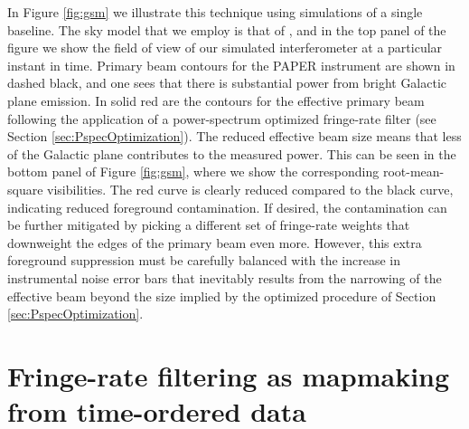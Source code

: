 \documentclass[twocolumn,apj,numberedappendix]{emulateapj}
\begin{document}
In Figure \ref{fig:gsm} we illustrate this technique using simulations of a single baseline. The sky model
that we employ is that of \citet{deoliveiracosta_et_al2008}, and in the top panel of the figure we show
the field of view of our simulated interferometer at a particular instant in time. Primary beam contours
for the PAPER instrument are shown in dashed black, and one sees that there is substantial power from
bright Galactic plane emission. In solid red are the contours for the effective primary beam following
the application of a power-spectrum optimized fringe-rate filter (see Section \ref{sec:PspecOptimization}).
The reduced effective beam size means that less of the Galactic plane contributes to the measured
power. This can be seen in the bottom panel of Figure \ref{fig:gsm}, where we show the corresponding
root-mean-square visibilities. The red curve is clearly reduced compared to the black curve, indicating
reduced foreground contamination. If desired, the contamination can be further mitigated by picking
a different set of fringe-rate weights that downweight the edges of the primary beam even more. However,
this extra foreground suppression must be carefully balanced with the increase in instrumental noise error
bars that inevitably results from the narrowing of the effective beam beyond the size implied by the optimized procedure of
Section \ref{sec:PspecOptimization}.






\section{Fringe-rate filtering as mapmaking from time-ordered data}
\label{sec:Mapmaking}
\end{document}
